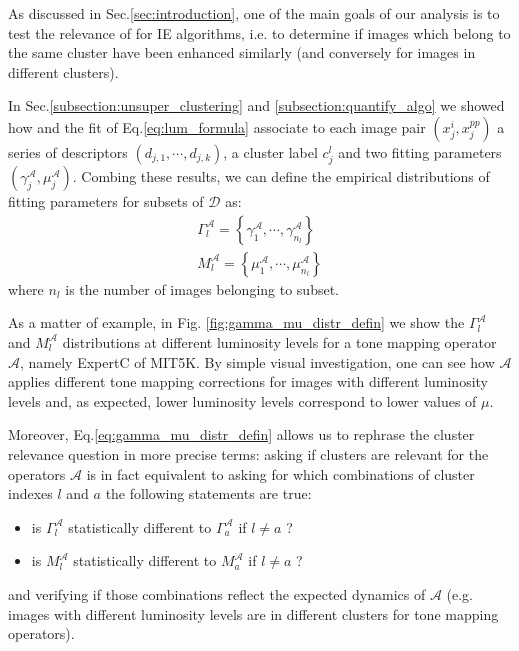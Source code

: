 \documentclass[12pt]{spieman}  %
\begin{document}
\begin{spacing}{2}
\begin{linenumbers}
As discussed in Sec.\ref{sec:introduction}, one of the main goals of our analysis is to test the relevance of \clustname  for IE algorithms, i.e. to determine if images which belong to the same cluster have been enhanced similarly (and conversely for images in different clusters).


In Sec.\ref{subsection:unsuper_clustering} and \ref{subsection:quantify_algo} we showed how \clustname and  the fit of Eq.\ref{eq:lum_formula} associate to each image pair  $\left (x^{i}_j, x^{pp}_j  \right )$ a series of descriptors $\left ( d_{j,1}, \cdots, d_{j,k} \right )$, a cluster label $c^l_j$ and two fitting parameters  $\left ( \gamma_j^{\mathcal{A}}, \mu_j^{\mathcal{A}} \right )$. Combing these results, we can define the empirical distributions of fitting parameters for subsets of $\mathcal{D}$ as:
\begin{equation}
	\begin{split}
		\Gamma_l^{\mathcal{A}} = \left \{  \gamma_1^{\mathcal{A}}, \cdots, \gamma_{n_l}^{\mathcal{A}} \right \} \\
		 M_l^{\mathcal{A}} = \left \{ \mu_1^{\mathcal{A}}, \cdots, \mu_{n_l}^{\mathcal{A}}  \right \}
	\end{split}
\label{eq:gamma_mu_distr_defin}
\end{equation}
where $n_l$ is the number of images belonging to subset. 


As a matter of example, in Fig. \ref{fig:gamma_mu_distr_defin} we show the $\Gamma_l^{\mathcal{A}}$ and $M_l^{\mathcal{A}}$ distributions at different luminosity levels for a tone mapping operator $\mathcal{A}$, namely ExpertC of MIT5K. By simple visual investigation, one can see how $\mathcal{A}$ applies different tone mapping corrections for images with different luminosity levels and, as expected, lower luminosity levels correspond to lower values of $\mu$. 


Moreover, Eq.\ref{eq:gamma_mu_distr_defin} allows us to rephrase the cluster relevance question in more precise terms: asking if clusters are relevant for the operators $\mathcal{A}$ is in fact equivalent to asking for which combinations of cluster indexes $l$ and $a$ the following statements are true:
\begin{itemize}
\item is $\Gamma_l^{\mathcal{A}}$ statistically different to $\Gamma_a^{\mathcal{A}}$ if $l \neq  a$  ?
\item is $M_l^{\mathcal{A}}$ statistically different to $M_a^{\mathcal{A}}$ if $l \neq  a$  ?
\end{itemize}
and verifying if those combinations reflect the expected dynamics of $\mathcal{A}$ (e.g. images with different luminosity levels are in different clusters for tone mapping operators). 



\end{linenumbers}
\end{spacing}
\end{document}
